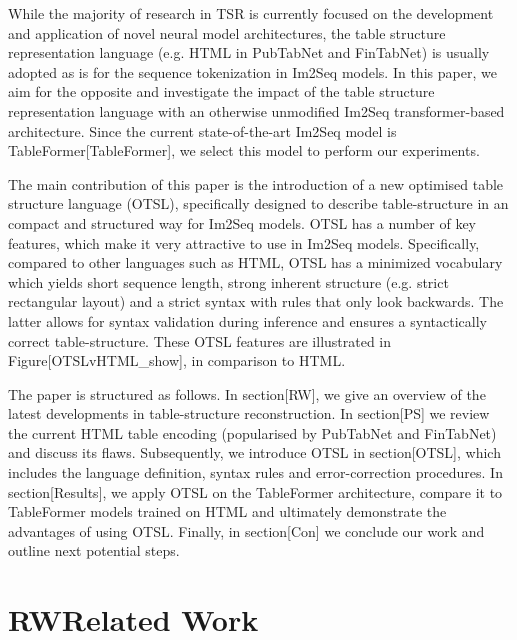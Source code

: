 \documentclass[11pt,a4paper]{article}
\begin{document}
While the majority of research in TSR is currently focused on the development and application of novel neural model architectures, the table structure representation language (e.g. HTML in PubTabNet and FinTabNet) is usually adopted as is for the sequence tokenization in Im2Seq models. In this paper, we aim for the opposite and investigate the impact of the table structure representation language with an otherwise unmodified Im2Seq transformer-based architecture. Since the current state-of-the-art Im2Seq model is TableFormer[TableFormer], we select this model to perform our experiments.

The main contribution of this paper is the introduction of a new optimised table structure language (OTSL), specifically designed to describe table-structure in an compact and structured way for Im2Seq models. OTSL has a number of key features, which make it very attractive to use in Im2Seq models. Specifically, compared to other languages such as HTML, OTSL has a minimized vocabulary which yields short sequence length, strong inherent structure (e.g. strict rectangular layout) and a strict syntax with rules that only look backwards. The latter allows for syntax validation during inference and ensures a syntactically correct table-structure. These OTSL features are illustrated in Figure[OTSLvHTML\_show], in comparison to HTML.

The paper is structured as follows. In section[RW], we give an overview of the latest developments in table-structure reconstruction. In section[PS] we review the current HTML table encoding (popularised by PubTabNet and FinTabNet) and discuss its flaws. Subsequently, we introduce OTSL in section[OTSL], which includes the language definition, syntax rules and error-correction procedures. In section[Results], we apply OTSL on the TableFormer architecture, compare it to TableFormer models trained on HTML and ultimately demonstrate the advantages of using OTSL. Finally, in section[Con] we conclude our work and outline next potential steps.

\section{RWRelated Work}
\end{document}
